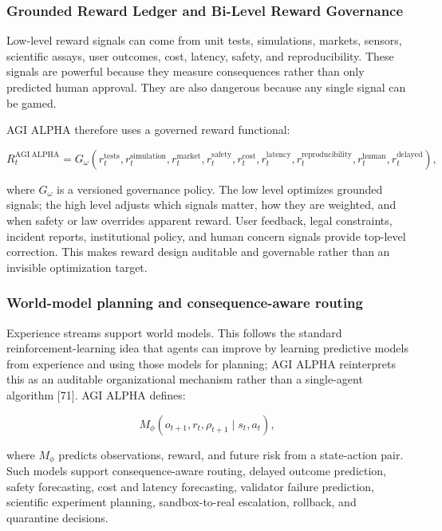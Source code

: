 \documentclass[11pt]{article}
\begin{document}
\subsubsection{Grounded Reward Ledger and Bi-Level Reward
Governance}\label{grounded-reward-ledger-and-bi-level-reward-governance}

Low-level reward signals can come from unit tests, simulations, markets,
sensors, scientific assays, user outcomes, cost, latency, safety, and
reproducibility. These signals are powerful because they measure
consequences rather than only predicted human approval. They are also
dangerous because any single signal can be gamed.

AGI ALPHA therefore uses a governed reward functional:

\[
R_t^{\mathrm{AGI\ ALPHA}}
=
G_\omega\left(r_t^{\mathrm{tests}},r_t^{\mathrm{simulation}},r_t^{\mathrm{market}},r_t^{\mathrm{safety}},r_t^{\mathrm{cost}},r_t^{\mathrm{latency}},r_t^{\mathrm{reproducibility}},r_t^{\mathrm{human}},r_t^{\mathrm{delayed}}\right),
\]

where \(G_\omega\) is a versioned governance policy. The low level
optimizes grounded signals; the high level adjusts which signals matter,
how they are weighted, and when safety or law overrides apparent reward.
User feedback, legal constraints, incident reports, institutional
policy, and human concern signals provide top-level correction. This
makes reward design auditable and governable rather than an invisible
optimization target.

\subsubsection{World-model planning and consequence-aware
routing}\label{world-model-planning-and-consequence-aware-routing}

Experience streams support world models. This follows the standard reinforcement-learning idea that agents can improve by learning predictive models from experience and using those models for planning; AGI ALPHA reinterprets this as an auditable organizational mechanism rather than a single-agent algorithm {[}71{]}. AGI ALPHA defines:

\[
M_\phi(o_{t+1},r_t,\rho_{t+1}\mid s_t,a_t),
\]

where \(M_\phi\) predicts observations, reward, and future risk from a
state-action pair. Such models support consequence-aware routing,
delayed outcome prediction, safety forecasting, cost and latency
forecasting, validator failure prediction, scientific experiment
planning, sandbox-to-real escalation, rollback, and quarantine
decisions.
\end{document}
